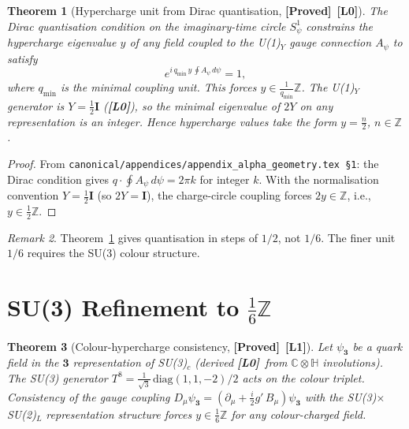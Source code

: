 \documentclass[12pt,a4paper]{article}
\newtheorem{theorem}{Theorem}[section]
\theoremstyle{definition}
\theoremstyle{remark}
\newtheorem{remark}[theorem]{Remark}
\newcommand{\PROVED}{\textbf{[Proved]}}
\newcommand{\Lzero}{\textbf{[L0]}}
\newcommand{\Lone}{\textbf{[L1]}}
\newcommand{\CC}{\mathbb{C}}
\newcommand{\HH}{\mathbb{H}}
\newcommand{\ZZ}{\mathbb{Z}}
\begin{document}
\begin{theorem}[Hypercharge unit from Dirac quantisation, \PROVED\ \Lzero]
\label{thm:dirac_Y}
The Dirac quantisation condition on the imaginary-time circle $S^1_\psi$
constrains the hypercharge eigenvalue $y$ of any field coupled to the
U(1)$_Y$ gauge connection $A_\psi$ to satisfy
\begin{equation}
\label{eq:dirac}
  e^{i\,q_{\min}\,y\,\oint A_\psi\,d\psi} = 1,
\end{equation}
where $q_{\min}$ is the minimal coupling unit.  This forces $y \in \frac{1}{q_{\min}}\ZZ$.
The U(1)$_Y$ generator is $Y = \frac{1}{2}\mathbf{I}$ (\Lzero), so
the minimal eigenvalue of $2Y$ on any representation is an integer.
Hence hypercharge values take the form $y = \frac{n}{2}$, $n \in \ZZ$.
\end{theorem}

\begin{proof}
From \texttt{canonical/appendices/appendix\_alpha\_geometry.tex §1}: the Dirac
condition gives $q \cdot \oint A_\psi\,d\psi = 2\pi k$ for integer $k$.
With the normalisation convention $Y = \frac{1}{2}\mathbf{I}$ (so $2Y = \mathbf{I}$),
the charge-circle coupling forces $2y \in \ZZ$, i.e., $y \in \frac{1}{2}\ZZ$.
\end{proof}

\begin{remark}
Theorem~\ref{thm:dirac_Y} gives quantisation in steps of $1/2$, not $1/6$.
The finer unit $1/6$ requires the SU(3) colour structure.
\end{remark}

\section{SU(3) Refinement to $\frac{1}{6}\ZZ$}
\label{sec:su3}

\begin{theorem}[Colour-hypercharge consistency, \PROVED\ \Lone]
\label{thm:colour_Y}
Let $\psi_{\mathbf{3}}$ be a quark field in the $\mathbf{3}$ representation
of SU(3)$_c$ (derived \Lzero\ from $\CC\otimes\HH$ involutions).
The SU(3) generator $T^8 = \frac{1}{\sqrt{3}}\,\mathrm{diag}(1,1,-2)/2$
acts on the colour triplet.  Consistency of the gauge coupling
$D_\mu\psi_{\mathbf{3}} = (\partial_\mu + \tfrac{i}{2}g'\,B_\mu)\psi_{\mathbf{3}}$
with the SU(3)$\times$SU(2)$_L$ representation structure forces
$y \in \frac{1}{6}\ZZ$ for any colour-charged field.
\end{theorem}
\end{document}
